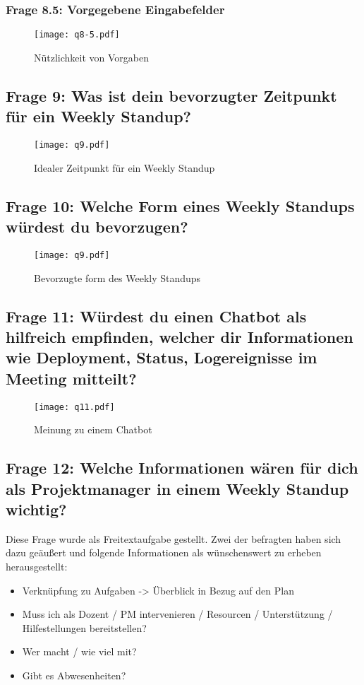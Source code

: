 \subsubsection{Frage 8.5: Vorgegebene Eingabefelder}
\begin{figure}[H]
	\centering
	\texttt{[image: q8-5.pdf]}
    \caption{Nützlichkeit von Vorgaben}
	\label{fig:q85}
\end{figure} 
\subsection{Frage 9: Was ist dein bevorzugter Zeitpunkt für ein Weekly Standup?}
\begin{figure}[H]
	\centering
	\texttt{[image: q9.pdf]}
    \caption{Idealer Zeitpunkt für ein Weekly Standup}
	\label{fig:q9}
\end{figure}  
\subsection{Frage 10: Welche Form eines Weekly Standups würdest du bevorzugen?}
\begin{figure}[H]
	\centering
	\texttt{[image: q9.pdf]}
    \caption{Bevorzugte form des Weekly Standups}
	\label{fig:q10}
\end{figure} 
\subsection{Frage 11: Würdest du einen Chatbot als hilfreich empfinden, welcher dir Informationen wie Deployment, Status, Logereignisse im Meeting mitteilt?}
\begin{figure}[H]
	\centering
	\texttt{[image: q11.pdf]}
    \caption{Meinung zu einem Chatbot}
	\label{fig:q11}
\end{figure} 
\subsection{Frage 12: Welche Informationen wären für dich als Projektmanager in einem Weekly Standup wichtig?}
Diese Frage wurde als Freitextaufgabe gestellt. Zwei der befragten haben sich dazu geäußert und folgende Informationen als wünschenswert zu erheben herausgestellt:
\begin{itemize}
\item Verknüpfung zu Aufgaben -> Überblick in Bezug auf den Plan
\item Muss ich als Dozent / PM intervenieren / Resourcen / Unterstützung / Hilfestellungen bereitstellen? 
\item Wer macht / wie viel mit? 
\item Gibt es Abwesenheiten?
\end{itemize}

